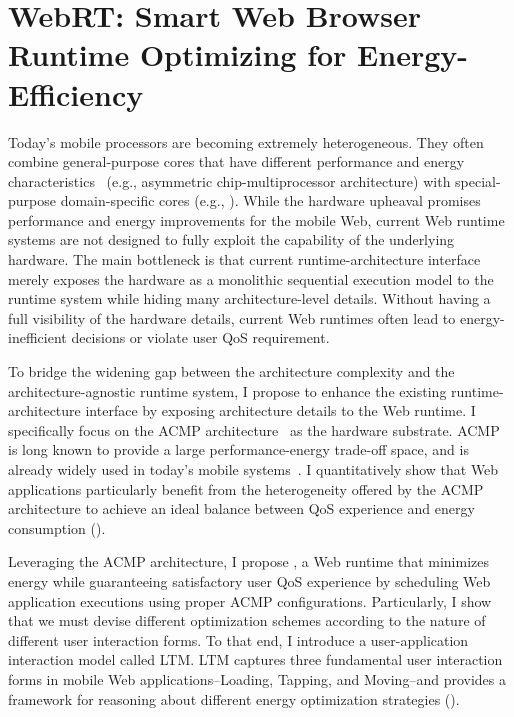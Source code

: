 
\chapter{WebRT: Smart Web Browser Runtime Optimizing for Energy-Efficiency}
\label{sec:runtime}

Today's mobile processors are becoming extremely heterogeneous. They often combine general-purpose cores that have different performance and energy characteristics~\cite{single-ISA} (e.g., asymmetric chip-multiprocessor architecture) with special-purpose domain-specific cores (e.g., \webcore). While the hardware upheaval promises performance and energy improvements for the mobile Web, current Web runtime systems are not designed to fully exploit the capability of the underlying hardware. The main bottleneck is that current runtime-architecture interface merely exposes the hardware as a monolithic sequential execution model to the runtime system while hiding many architecture-level details. Without having a full visibility of the hardware details, current Web runtimes often lead to energy-inefficient decisions or violate user QoS requirement.

To bridge the widening gap between the architecture complexity and the architecture-agnostic runtime system, I propose to enhance the existing runtime-architecture interface by exposing architecture details to the Web runtime. I specifically focus on the ACMP architecture~\cite{acmp,single-ISA} as the hardware substrate. ACMP is long known to provide a large performance-energy trade-off space, and is already widely used in today's mobile systems~\cite{big-little-future,exynos5biglittle}. I  quantitatively show that Web applications particularly benefit from the heterogeneity offered by the ACMP architecture to achieve an ideal balance between QoS experience and energy consumption ().

Leveraging the ACMP architecture, I propose \webrt, a Web runtime that minimizes energy while guaranteeing satisfactory user QoS experience by scheduling Web application executions using proper ACMP configurations. Particularly, I show that we must devise different optimization schemes according to the nature of different user interaction forms. To that end, I introduce a user-application interaction model called LTM. LTM captures three fundamental user interaction forms in mobile Web applications--Loading, Tapping, and Moving--and provides a framework for reasoning about different energy optimization strategies ().

